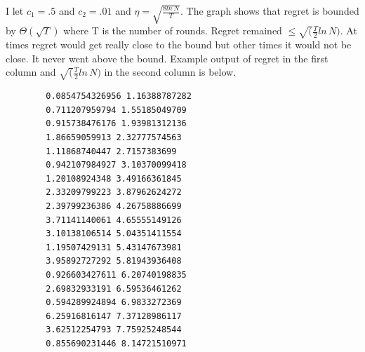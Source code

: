 \documentclass[12pt]{article}
\begin{document}
\begin{enumerate}
\begin{enumerate}
\begin{figure}[H]
  	    \end{figure}
  	    I let $c_1 = .5$ and $c_2 = .01$ and $\eta = \sqrt{\frac{8ln\,N}{T}}$. 
  	    The graph shows that regret is bounded by $\Theta{(\sqrt{T})}$ where T is the number of rounds. Regret remained
  	    $\le \sqrt(\frac{T}{2}ln\,N)$.  At times regret would get really close to
  	    the bound but other times it would not be close.  It never went above the
  	    bound. Example output of regret in the first column and
  	    $\sqrt(\frac{T}{2}ln\,N)$ in the second column is below.
  	    \scriptsize
  	    \begin{verbatim}
		0.0854754326956 1.16388787282
		0.711207959794 1.55185049709
		0.915738476176 1.93981312136
		1.86659059913 2.32777574563
		1.11868740447 2.7157383699
		0.942107984927 3.10370099418
		1.20108924348 3.49166361845
		2.33209799223 3.87962624272
		2.39799236386 4.26758886699
		3.71141140061 4.65555149126
		3.10138106514 5.04351411554
		1.19507429131 5.43147673981
		3.95892727292 5.81943936408
		0.926603427611 6.20740198835
		2.69832933191 6.59536461262
		0.594289924894 6.9833272369
		6.25916816147 7.37128986117
		3.62512254793 7.75925248544
		0.855690231446 8.14721510971
  	    \end{verbatim}
  	    \normalsize
  	\end{enumerate}
  	

\end{enumerate}
\end{document}
